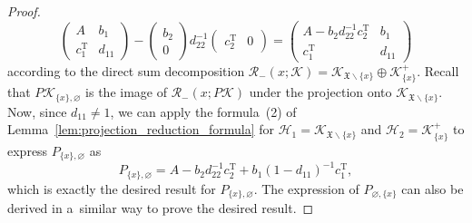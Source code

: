 \documentclass[11pt]{article}
\numberwithin{equation}{section}
\numberwithin{equation}{section}
\newcommand{\mfrak}[1]{\mathfrak{#1}}
\newcommand{\mcal}[1]{\mathcal{#1}}
\newcommand{\mrm}[1]{\mathrm{#1}}
\begin{document}
\begin{proof}
\begin{equation*}
	\left(
	\begin{matrix}
	A & b_{1} \\
	c_{1}^{\mrm{T}} & d_{11}
	\end{matrix}
	\right)-
	\left(
	\begin{matrix}
		b_{2} \\
		0
	\end{matrix}
	\right)d_{22}^{-1}\left(
	\begin{matrix}
		c_{2}^{\mrm{T}} & 0
	\end{matrix}
	\right)=
	\left(
	\begin{matrix}
		A-b_{2}d_{22}^{-1}c_{2}^{\mrm{T}} & b_{1} \\
		c_{1}^{\mrm{T}} & d_{11}
	\end{matrix}
	\right)
\end{equation*}
according to the direct sum decomposition $\mcal{R}_{-}(x;\mcal{K})=\mcal{K}_{\mfrak{X}\backslash\{x\}}\oplus \mcal{K}_{\{x\}}^{+}$.
Recall that $P\mcal{K}_{\{x\},\varnothing}$ is the image of $\mcal{R}_{-}(x;P\mcal{K})$ under the projection onto $\mcal{K}_{\mfrak{X}\backslash\{x\}}$.
Now, since $d_{11}\neq 1$, we can apply the formula~(2) of Lemma~\ref{lem:projection_reduction_formula} for $\mcal{H}_{1}=\mcal{K}_{\mfrak{X}\backslash\{x\}}$ and $\mcal{H}_{2}=\mcal{K}_{\{x\}}^{+}$ to express $P_{\{x\},\varnothing}$ as
\begin{equation*}
	P_{\{x\},\varnothing}=A-b_{2}d_{22}^{-1}c_{2}^{\mrm{T}}+b_{1}(1-d_{11})^{-1}c_{1}^{\mrm{T}},
\end{equation*}
which is exactly the desired result for $P_{\{x\},\varnothing}$.
The expression of $P_{\varnothing,\{x\}}$ can also be derived in a~similar way to prove the desired result.
\end{proof}
\end{document}
